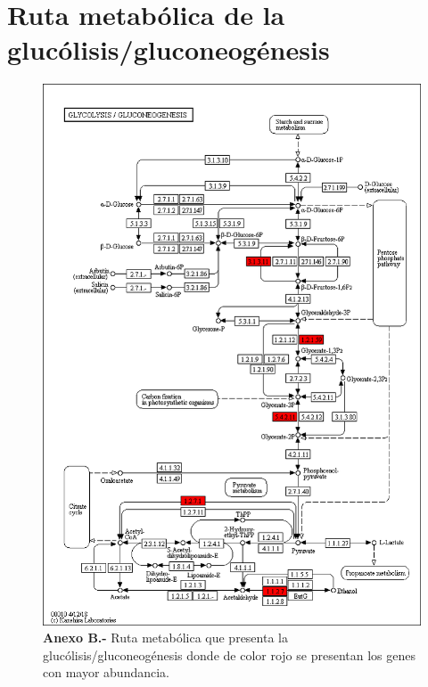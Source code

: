 \documentclass[12pt,letterpaper,oneside]{report}
\begin{document}
\chapter{Ruta metabólica de la glucólisis/gluconeogénesis}
\begin{figure}[!h]
\centering
\centerline{\includegraphics[scale=0.44]{apendices/B-2}}
\caption*{\textbf{Anexo B.-} Ruta metabólica que presenta la glucólisis/gluconeogénesis donde de color rojo se presentan los genes con mayor abundancia.}
\end{figure}
\end{document}

